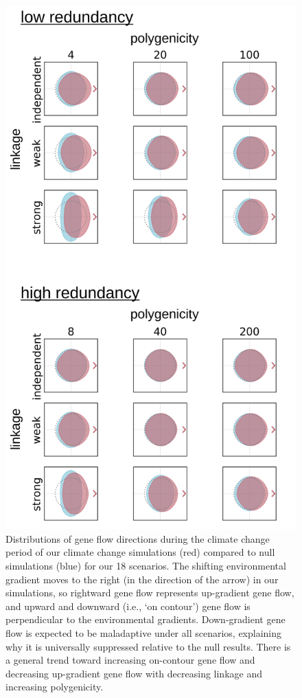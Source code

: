 \documentclass[9pt,twocolumn,twoside,lineno]{new_article}
\begin{document}
\begin{figure}
\centering
\includegraphics[width=.8\linewidth]{pub/figs_and_stats/FIG_2_gene_flow.jpg}
    \caption{Distributions of gene flow directions during the climate change period of our climate change simulations (red) compared to null simulations (blue) for our 18 scenarios.  The shifting environmental gradient moves to the right (in the direction of the arrow) in our simulations, so rightward gene flow represents up-gradient gene flow, and upward and downward (i.e., `on contour’) gene flow is perpendicular to the environmental gradients. Down-gradient gene flow is expected to be maladaptive under all scenarios, explaining why it is universally suppressed relative to the null results. There is a general trend toward increasing on-contour gene flow and decreasing up-gradient gene flow with decreasing linkage and increasing polygenicity.
}
\label{fig:fig_2}
\end{figure}
\end{document}
